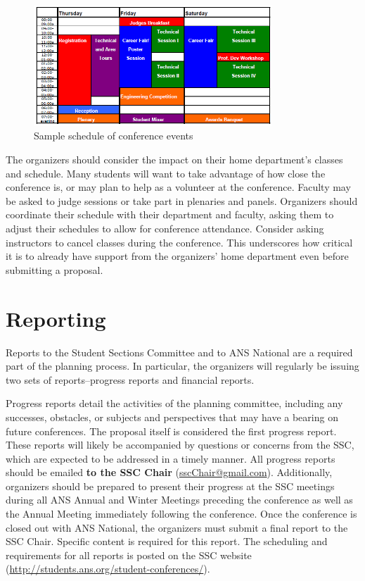 \documentclass[12pt]{article}
\begin{document}
\begin{figure}[h]
    \centering
    \includegraphics[width=0.8\textwidth]{SampSched.PNG}
    \caption{Sample schedule of conference events}
    \label{fig:Schedule}
\end{figure}


The organizers should consider the impact on their home department's classes and schedule.
Many students will want to take advantage of how close the conference is, or may plan to help as a volunteer at the conference.
Faculty may be asked to judge sessions or take part in plenaries and panels.
Organizers should coordinate their schedule with their department and faculty, asking them to adjust their schedules to allow for conference attendance.
Consider asking instructors to cancel classes during the conference.
This underscores how critical it is to already have support from the organizers' home department even before submitting a proposal.

\clearpage
\section{Reporting}
Reports to the Student Sections Committee and to ANS National are a required part of the planning process.
In particular, the organizers will regularly be issuing two sets of reports\---progress reports and financial reports.

Progress reports detail the activities of the planning committee, including any successes, obstacles, or subjects and perspectives that may have a bearing on future conferences. 
The proposal itself is considered the first progress report.
These reports will likely be accompanied by questions or concerns from the SSC, which are expected to be addressed in a timely manner.
All progress reports should be emailed \textbf{to the SSC Chair} (\href{mailto:sscChair@gmail.com}{sscChair@gmail.com}).
Additionally, organizers should be prepared to present their progress at the SSC meetings during all ANS Annual and Winter Meetings preceding the conference as well as the Annual Meeting immediately following the conference. 
Once the conference is closed out with ANS National, the organizers must submit a final report to the SSC Chair.
Specific content is required for this report.
The scheduling and requirements for all reports is posted on the SSC website (\href{http://students.ans.org/student-conferences/}{http://students.ans.org/student-conferences/}).
\end{document}
